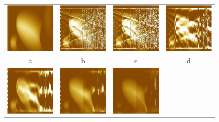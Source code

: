 \documentclass{procDDs}
\begin{document}
\begin{figure}[h!]\center%
	\begin{tabular}{cccc}
		\includegraphics[width=0.2\linewidth]{k-img-17-1.jpg}&
		\includegraphics[width=0.2\linewidth]{k-img-17-3.jpg}&
		\includegraphics[width=0.2\linewidth]{k-img-17-4.jpg}&
		\includegraphics[width=0.2\linewidth]{k-img-17-6.jpg}\\
		a & b & c & d\\
		\includegraphics[width=0.2\linewidth]{k-img-17-8.jpg}&
		\includegraphics[width=0.2\linewidth]{k-img-17-10.jpg}&
		\includegraphics[width=0.2\linewidth]{k-img-17-11.jpg}&

\end{tabular}
\end{figure}
\end{document}
